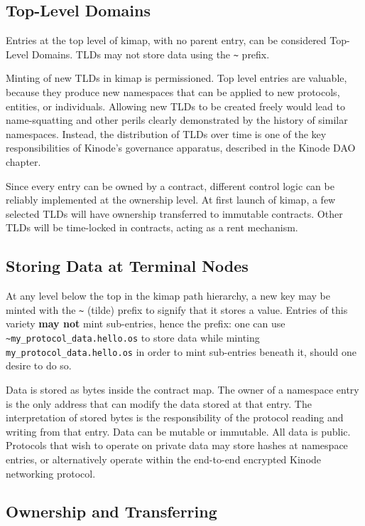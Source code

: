 \documentclass[runningheads]{llncs}
\begin{document}
\subsection{Top-Level Domains}

Entries at the top level of kimap, with no parent entry, can be considered Top-Level Domains.
TLDs may not store data using the \verb|~| prefix.

Minting of new TLDs in kimap is permissioned.
Top level entries are valuable, because they produce new namespaces that can be applied to new protocols, entities, or individuals.
Allowing new TLDs to be created freely would lead to name-squatting and other perils clearly demonstrated by the history of similar namespaces.
Instead, the distribution of TLDs over time is one of the key responsibilities of Kinode's governance apparatus, described in the Kinode DAO chapter.

Since every entry can be owned by a contract, different control logic can be reliably implemented at the ownership level.
At first launch of kimap, a few selected TLDs will have ownership transferred to immutable contracts.
Other TLDs will be time-locked in contracts, acting as a rent mechanism.

\subsection{Storing Data at Terminal Nodes}

At any level below the top in the kimap path hierarchy, a new key may be minted with the \verb|~| (tilde) prefix to signify that it stores a value.
Entries of this variety \textbf{may not} mint sub-entries, hence the prefix: one can use \verb|~my_protocol_data.hello.os| to store data while minting \verb|my_protocol_data.hello.os| in order to mint sub-entries beneath it, should one desire to do so.

Data is stored as bytes inside the contract map.
The owner of a namespace entry is the only address that can modify the data stored at that entry.
The interpretation of stored bytes is the responsibility of the protocol reading and writing from that entry.
Data can be mutable or immutable.
All data is public.
Protocols that wish to operate on private data may store hashes at namespace entries, or alternatively operate within the end-to-end encrypted Kinode networking protocol.

\subsection{Ownership and Transferring}
\end{document}
